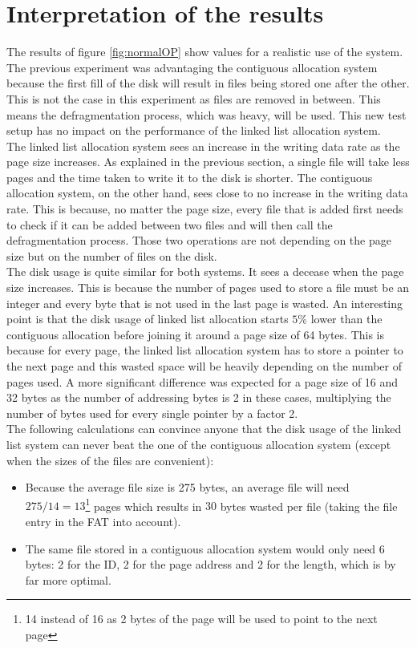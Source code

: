 \documentclass[10pt,a4paper]{ULBreport}
\begin{document}
\section{Interpretation of the results}
The results of figure \ref{fig:normalOP} show values for a realistic use of the system. The previous experiment was advantaging the contiguous allocation system because the first fill of the disk will result in files being stored one after the other. This is not the case in this experiment as files are removed in between. This means the defragmentation process, which was heavy, will be used. This new test setup has no impact on the performance of the linked list allocation system.\\
The linked list allocation system sees an increase in the writing data rate as the page size increases. As explained in the previous section, a single file will take less pages and the time taken to write it to the disk is shorter. The contiguous allocation system, on the other hand, sees close to no increase in the writing data rate. This is because, no matter the page size, every file that is added first needs to check if it can be added between two files and will then call the defragmentation process. Those two operations are not depending on the page size but on the number of files on the disk. \\
The disk usage is quite similar for both systems. It sees a decease when the page size increases. This is because the number of pages used to store a file must be an integer and every byte that is not used in the last page is wasted. An interesting point is that the disk usage of linked list allocation starts $5\%$ lower than the contiguous allocation before joining it around a page size of 64 bytes. This is because for every page, the linked list allocation system has to store a pointer to the next page and this wasted space will be heavily depending on the number of pages used. A more significant difference was expected for a page size of 16 and 32 bytes as the number of addressing bytes is 2 in these cases, multiplying the number of bytes used for every single pointer by a factor 2. \\
The following calculations can convince anyone that the disk usage of the linked list system can never beat the one of the contiguous allocation system (except when the sizes of the files are convenient):
\begin{itemize}
    \item Because the average file size is 275 bytes, an average file will need $275/14 = 13$\footnote{14 instead of 16 as 2 bytes of the page will be used to point to the next page} pages which results in $30$ bytes wasted per file (taking the file entry in the FAT into account).
    \item The same file stored in a contiguous allocation system would only need $6$ bytes: 2 for the ID, 2 for the page address and 2 for the length, which is by far more optimal. 
\end{itemize}
\end{document}
